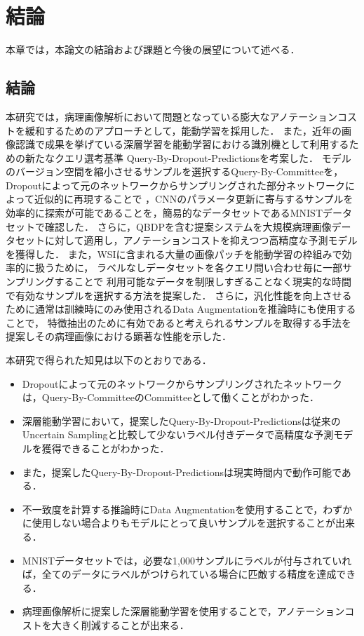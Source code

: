 \chapter{結論}
本章では，本論文の結論および課題と今後の展望について述べる．

\section{結論}
本研究では，病理画像解析において問題となっている膨大なアノテーションコストを緩和するためのアプローチとして，能動学習を採用した．
また，近年の画像認識で成果を挙げている深層学習を能動学習における識別機として利用するための新たなクエリ選考基準 Query-By-Dropout-Predictionsを考案した．
モデルのバージョン空間を縮小させるサンプルを選択するQuery-By-Committeeを，Dropoutによって元のネットワークからサンプリングされた部分ネットワークによって近似的に再現することで
，CNNのパラメータ更新に寄与するサンプルを効率的に探索が可能であることを，簡易的なデータセットであるMNISTデータセットで確認した．
さらに，QBDPを含む提案システムを大規模病理画像データセットに対して適用し，アノテーションコストを抑えつつ高精度な予測モデルを獲得した．
また，WSIに含まれる大量の画像パッチを能動学習の枠組みで効率的に扱うために，
ラベルなしデータセットを各クエリ問い合わせ毎に一部サンプリングすることで
利用可能なデータを制限しすぎることなく現実的な時間で有効なサンプルを選択する方法を提案した．
さらに，汎化性能を向上させるために通常は訓練時にのみ使用されるData Augmentationを推論時にも使用することで，
特徴抽出のために有効であると考えられるサンプルを取得する手法を提案しその病理画像における顕著な性能を示した．

本研究で得られた知見は以下のとおりである．
\begin{itemize}
\item Dropoutによって元のネットワークからサンプリングされたネットワークは，Query-By-CommitteeのCommitteeとして働くことがわかった．
\item 深層能動学習において，提案したQuery-By-Dropout-Predictionsは従来のUncertain Samplingと比較して少ないラベル付きデータで高精度な予測モデルを獲得できることがわかった．
\item また，提案したQuery-By-Dropout-Predictionsは現実時間内で動作可能である．
\item 不一致度を計算する推論時にData Augmentationを使用することで，わずかに使用しない場合よりもモデルにとって良いサンプルを選択することが出来る．
\item MNISTデータセットでは，必要な1,000サンプルにラベルが付与されていれば，全てのデータにラベルがつけられている場合に匹敵する精度を達成できる．
\item 病理画像解析に提案した深層能動学習を使用することで，アノテーションコストを大きく削減することが出来る．
\end{itemize}

